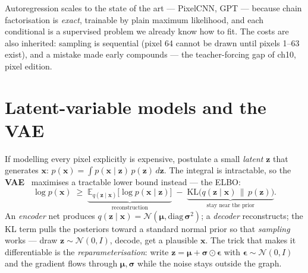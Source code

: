 Autoregression scales to the state of the art --- PixelCNN, GPT ---
because chain factorisation is \emph{exact}, trainable by plain
maximum likelihood, and each conditional is a supervised problem we
already know how to fit. The costs are also inherited: sampling is
sequential (pixel 64 cannot be drawn until pixels 1--63 exist), and a
mistake made early compounds --- the teacher-forcing gap of ch10,
pixel edition.

\section{Latent-variable models and the VAE}
\label{sec:vae}

If modelling every pixel explicitly is expensive, postulate a small
\emph{latent} $\mathbf z$ that generates
$\mathbf x$: $p(\mathbf x) = \int p(\mathbf x \mid \mathbf z)\,
p(\mathbf z)\,d\mathbf z$. The integral is intractable, so the
\textbf{VAE}~\cite{kingma2013} maximises a tractable lower
bound instead --- the ELBO:
\[
\log p(\mathbf x) \;\geq\; \underbrace{\mathbb E_{q(\mathbf z\mid
\mathbf x)}\big[\log p(\mathbf x\mid\mathbf z)\big]}_{\text{reconstruction}}
\;-\; \underbrace{\mathrm{KL}\!\big(q(\mathbf z\mid\mathbf x)
\,\|\, p(\mathbf z)\big)}_{\text{stay near the prior}}.
\]
An \emph{encoder} net produces $q(\mathbf z\mid\mathbf x) = \mathcal
N(\boldsymbol\mu, \mathrm{diag}\,\boldsymbol\sigma^2)$; a
\emph{decoder} reconstructs; the KL term pulls the posteriors toward
a standard normal prior so that \emph{sampling} works --- draw
$\mathbf z \sim \mathcal N(0,I)$, decode, get a plausible $\mathbf x$.
The trick that makes it differentiable is the
\emph{reparameterisation}: write
$\mathbf z = \boldsymbol\mu + \boldsymbol\sigma \odot
\boldsymbol\epsilon$ with $\boldsymbol\epsilon \sim \mathcal N(0,I)$
and the gradient flows through $\boldsymbol\mu,\boldsymbol\sigma$
while the noise stays outside the graph.

